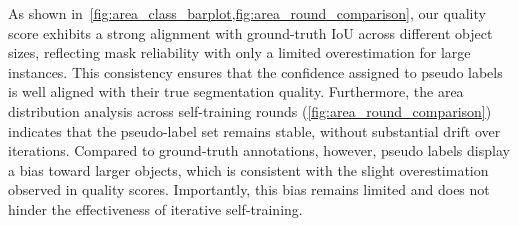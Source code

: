 As shown in~\cref{fig:area_class_barplot,fig:area_round_comparison}, our quality score exhibits a strong alignment with ground-truth IoU across different object sizes, reflecting mask reliability with only a limited overestimation for large instances. This consistency ensures that the confidence assigned to pseudo labels is well aligned with their true segmentation quality. Furthermore, the area distribution analysis across self-training rounds (\cref{fig:area_round_comparison}) indicates that the pseudo-label set remains stable, without substantial drift over iterations. Compared to ground-truth annotations, however, pseudo labels display a bias toward larger objects, which is consistent with the slight overestimation observed in quality scores. Importantly, this bias remains limited and does not hinder the effectiveness of iterative self-training.

\begin{table}[t]
\caption{
    \textbf{UVO-Dense \texttt{val}.} We reproduced the state-of-the-art VideoCutLER~\cite{videocutler} with the official code and checkpoint. AutoQ-VIS outperforms the previous state-of-the-art VideoCutLER by 1.1 $\text{AP}_{50}$. We evaluate results on UVO-Dense's \texttt{val} split in a class-agnostic manner.
}
\label{tab:uvo_dense}
\end{table}

